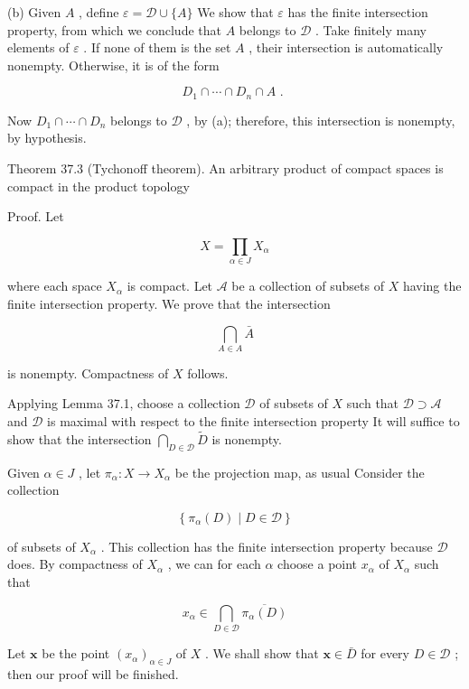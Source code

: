 \documentclass[10pt]{article}
\begin{document}
(b) Given \(A\) , define \(\varepsilon  = \mathcal{D} \cup  \{ A\}\) We show that \(\varepsilon\) has the finite intersection property, from which we conclude that \(A\) belongs to \(\mathcal{D}\) . Take finitely many elements of \(\varepsilon\) . If none of them is the set \(A\) , their intersection is automatically nonempty. Otherwise, it is of the form

\[
{D}_{1} \cap  \cdots  \cap  {D}_{n} \cap  A\text{ . }
\]

Now \({D}_{1} \cap  \cdots  \cap  {D}_{n}\) belongs to \(\mathcal{D}\) , by (a); therefore, this intersection is nonempty, by hypothesis.

Theorem 37.3 (Tychonoff theorem). An arbitrary product of compact spaces is compact in the product topology

Proof. Let

\[
X = \mathop{\prod }\limits_{{\alpha  \in  J}}{X}_{\alpha }
\]

where each space \({X}_{\alpha }\) is compact. Let \(\mathcal{A}\) be a collection of subsets of \(X\) having the finite intersection property. We prove that the intersection

\[
\mathop{\bigcap }\limits_{{A \in  A}}\bar{A}
\]

is nonempty. Compactness of \(X\) follows.

Applying Lemma 37.1, choose a collection \(\mathcal{D}\) of subsets of \(X\) such that \(\mathcal{D} \supset  \mathcal{A}\) and \(\mathcal{D}\) is maximal with respect to the finite intersection property It will suffice to show that the intersection \(\mathop{\bigcap }\limits_{{D \in  \mathcal{D}}}\widetilde{D}\) is nonempty.

Given \(\alpha  \in  J\) , let \({\pi }_{\alpha } : X \rightarrow  {X}_{\alpha }\) be the projection map, as usual Consider the collection

\[
\left\{  {{\pi }_{\alpha }\left( D\right)  \mid  D \in  \mathcal{D}}\right\}
\]

of subsets of \({X}_{\alpha }\) . This collection has the finite intersection property because \(\mathcal{D}\) does. By compactness of \({X}_{\alpha }\) , we can for each \(\alpha\) choose a point \({x}_{\alpha }\) of \({X}_{\alpha }\) such that

\[
{x}_{\alpha } \in  \mathop{\bigcap }\limits_{{D \in  \mathcal{D}}}\overline{{\pi }_{\alpha }\left( D\right) }
\]

Let \(\mathbf{x}\) be the point \({\left( {x}_{\alpha }\right) }_{\alpha  \in  J}\) of \(X\) . We shall show that \(\mathbf{x} \in  \bar{D}\) for every \(D \in  \mathcal{D}\) ; then our proof will be finished.
\end{document}
